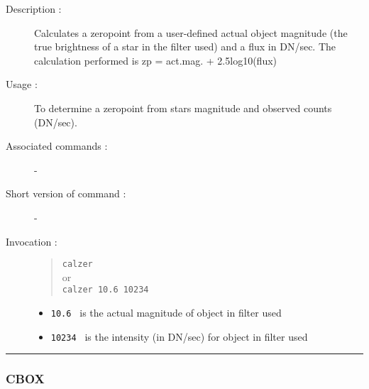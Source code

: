 \begin{description}

\item[Description :] Calculates a zeropoint from a user-defined actual
object magnitude (the true brightness of a star in the filter used) and
a flux in DN/sec.  The calculation performed is zp = act.mag. +
2.5log10(flux)

\item[Usage :] To determine a zeropoint from stars magnitude and
observed counts (DN/sec).
\item[Associated commands :] -
\item[Short version of command :] -
\item[Invocation :]

\begin{quote}{\tt  calzer }\\
or \\
{\tt calzer 10.6 10234 }
\end{quote}

\begin{itemize}

\item {\tt 10.6 } is the actual magnitude of object in filter used
\item {\tt 10234 } is the intensity (in DN/sec) for object in filter used

\end{itemize}
\end{description}

\hrule 
\subsubsection*{\label{CBOX}CBOX}


